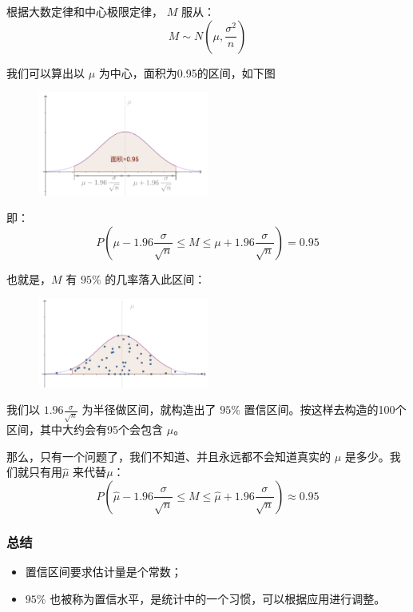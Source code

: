 \documentclass[12pt]{article}
\begin{document}
根据大数定律和中心极限定律， $M$ 服从：
$$
M \sim N(\mu, \frac{\sigma^2}{n})
$$

我们可以算出以 $\mu$ 为中心，面积为0.95的区间，如下图
\begin{figure}[H]
    \centering
    \includegraphics[width=0.5\textwidth]{fig/Confidence_Interval_Example_7.png}
\end{figure}

即：
$$
P(\mu - 1.96\frac{\sigma}{\sqrt{n}} \le M \le \mu + 1.96\frac{\sigma}{\sqrt{n}}) = 0.95
$$

也就是，$M$ 有 $95\%$  的几率落入此区间：
\begin{figure}[H]
    \centering
    \includegraphics[width=0.5\textwidth]{fig/Confidence_Interval_Example_8.png}
\end{figure}

我们以 $1.96\frac{\sigma}{\sqrt{n}}$ 为半径做区间，就构造出了  $95\%$ 置信区间。按这样去构造的100个区间，其中大约会有95个会包含 $\mu$。

那么，只有一个问题了，我们不知道、并且永远都不会知道真实的 $\mu$ 是多少。我们就只有用$\hat{\mu}$ 来代替$\mu$：
$$
P(\hat{\mu} - 1.96\frac{\sigma}{\sqrt{n}} \le M \le \hat{\mu} + 1.96\frac{\sigma}{\sqrt{n}}) \approx 0.95
$$

\subsubsection{总结}
\begin{itemize}
\setlength{\itemsep}{0pt}
\setlength{\parsep}{0pt}
\setlength{\parskip}{0pt}
    \item 置信区间要求估计量是个常数；
    \item $95\%$ 也被称为置信水平，是统计中的一个习惯，可以根据应用进行调整。
\end{itemize}
\end{document}
